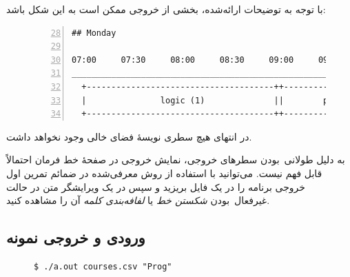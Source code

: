 \documentclass{utap}
\begin{document}
    با توجه به توضیحات ارائه‌شده، بخشی از خروجی ممکن است به این شکل باشد:
    \begin{figure}[H]
    \noindent\hspace{0.1\linewidth}
    \begin{minipage}{0.8\textwidth}
    \begin{latin}
    \begin{Verbatim}[numbers=left,frame=leftline,numbersep=2pt,firstnumber=28,baselinestretch=0.75]
## Monday

07:00     07:30     08:00     08:30     09:00     09:30
_______________________________________________________
  +--------------------------------------++------------
  |               logic (1)              ||        prob
  +--------------------------------------++------------
    \end{Verbatim}
    \end{latin}
    \end{minipage}
    \end{figure}

    در انتهای هیچ سطری نویسهٔ فضای خالی وجود نخواهد داشت.

    به دلیل طولانی~بودن سطرهای خروجی، نمایش خروجی در صفحهٔ خط فرمان احتمالاً قابل فهم نیست. می‌توانید با استفاده از روش معرفی‌شده در ضمائم تمرین اول خروجی برنامه را در یک فایل بریزید و سپس در یک ویرایشگر متن در حالت غیرفعال~بودن \textit{شکستن خط} یا \textit{لفافه‌بندی کلمه} آن را مشاهده کنید.

    \clearpage

    \subsection{ورودی و خروجی نمونه\label{sec:sample}}

    \begin{latin}
    \begin{figure}[H]
    \centering
    \begin{Verbatim}[frame=topline,label={\rl{ورودی}}]
$ ./a.out courses.csv "Prog"
    \end{Verbatim}
    \end{figure}
    \end{latin}

    \begin{latin}
    \begin{figure}[H]
    \centering
    \end{figure}
    \end{latin}
\end{document}
